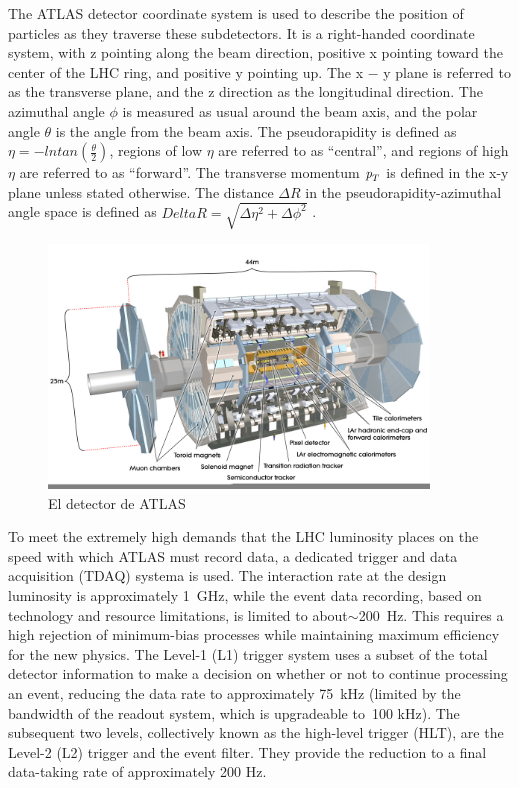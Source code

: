 The ATLAS detector coordinate system is used to describe the position of particles as they traverse these subdetectors. It is a right-handed coordinate system, with z pointing along the beam direction, positive x pointing toward the center of the LHC ring, and positive y pointing up. The x − y plane is referred to as the transverse plane, and the z direction as the longitudinal
direction. The azimuthal angle $\phi$ is measured as usual around the beam axis, and the polar angle $\theta$ is the angle from the beam axis. The pseudorapidity is defined as $\eta = − ln tan(\frac{\theta}{2})$, regions of low $\eta$ are referred to as ``central'', and regions of high $\eta$ are referred to as ``forward''. %
The transverse momentum ${\emph{p}_{T}}$ is defined in the x-y plane unless stated otherwise. The distance $\Delta R$ in the pseudorapidity-azimuthal angle space is defined as $Delta R = \sqrt{ \Delta \eta^2  + \Delta \phi^2}$ .

\begin{figure}[htbp]
  \begin{center}
      \includegraphics[width=0.9\textwidth]{Fig2/ATLASDetector.pdf}
    \caption{El detector de ATLAS}
    \label{fig:ATLAS}
  \end{center}
\end{figure}

To meet the extremely high demands that the LHC luminosity places on the speed with which ATLAS must record data, a dedicated trigger and data acquisition (TDAQ) systema is used. The interaction rate at the design luminosity is approximately 1~GHz, while the event data recording, based on technology and resource limitations, is limited to about$\sim$200~Hz. This requires a high rejection of minimum-bias processes while maintaining maximum efficiency for the new physics. The Level-1 (L1) trigger system uses a
subset of the total detector information to make a decision on whether or not to continue processing an event, reducing the data rate to approximately 75~kHz (limited by the bandwidth of the readout system, which is upgradeable to~100 kHz). The subsequent two levels, collectively known as the high-level trigger (HLT), are the Level-2 (L2) trigger and the event filter. They provide the reduction to a final data-taking rate of approximately 200 Hz. 



